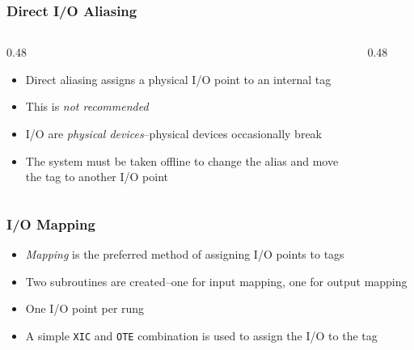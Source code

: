 \begin{frame}
    \frametitle{Direct I/O Aliasing}

    \begin{columns}
        \begin{column}{0.48\linewidth}
            \begin{itemize}
                \item Direct aliasing assigns a physical I/O point to an internal tag
                \item This is \emph{not recommended}
                \item I/O are \emph{physical devices}--physical devices occasionally break
                \item The system must be taken offline to change the alias and move the tag to another I/O point
            \end{itemize}
        \end{column}
        \begin{column}{0.48\linewidth}
            \begin{figure}
                \centering
                \resizebox{\linewidth}{!}{
                    
                }
            \end{figure}
        \end{column}
    \end{columns}
\end{frame}

\begin{frame}
    \frametitle{I/O Mapping}

    \begin{itemize}
        \item \emph{Mapping} is the preferred method of assigning I/O points to tags
        \item Two subroutines are created--one for input mapping, one for output mapping
        \item One I/O point per rung
        \item A simple \texttt{XIC} and \texttt{OTE} combination is used to assign the I/O to the tag
    \end{itemize}
\end{frame}

